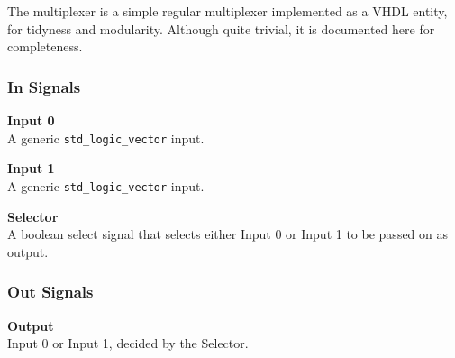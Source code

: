 The multiplexer is a simple regular multiplexer implemented as a VHDL entity, for tidyness and modularity.
Although quite trivial, it is documented here for completeness.

\subsubsection{In Signals}

\begin{description}
\item{\textbf{Input 0}} \\

A generic \texttt{std\_logic\_vector} input.

\item{\textbf{Input 1}} \\

A generic \texttt{std\_logic\_vector} input.

\item{\textbf{Selector}} \\

A boolean select signal that selects either Input 0 or Input 1 to be passed on as output.

\end{description}

\subsubsection{Out Signals}

\begin{description}
\item{\textbf{Output}} \\

Input 0 or Input 1, decided by the Selector.

\end{description}
